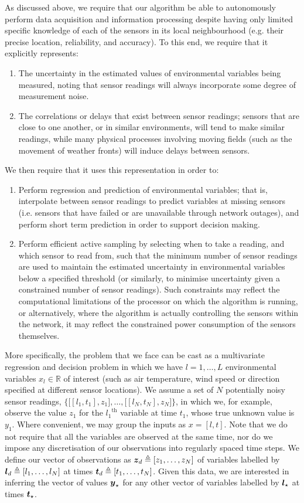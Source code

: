 \documentclass{acmtrans2m}
\begin{document}
\noindent As discussed above, we require that our algorithm be able to autonomously perform data acquisition and information processing despite having only limited specific knowledge of each of the sensors in its local neighbourhood (e.g. their precise location, reliability, and accuracy). To this end, we require that it explicitly represents:
\begin{enumerate}
\item The uncertainty in the estimated values of environmental variables being measured, noting that sensor readings will always incorporate some degree of measurement noise.
\item The correlations or delays that exist between sensor readings; sensors that are close to one another, or in similar environments, will tend to make similar readings, while many physical processes involving moving fields (such as the movement of weather fronts) will induce delays between sensors.
\end{enumerate}
We then require that it uses this representation in order to:
\begin{enumerate}
\item Perform regression and prediction of environmental variables; that is, interpolate between sensor readings to predict variables at missing sensors (i.e. sensors that have failed or are unavailable through network outages), and perform short term prediction in order to support decision making.
\item Perform efficient active sampling by selecting when to take a reading, and which sensor to read from, such that the minimum number of sensor readings are used to maintain the estimated uncertainty in environmental variables below a specified threshold (or similarly, to minimise uncertainty given a constrained number of sensor readings). Such constraints may reflect the computational limitations of the processor on which the algorithm is running, or alternatively, where the algorithm is actually controlling the sensors within the network, it may reflect the constrained power consumption of the sensors themselves.
\end{enumerate}
More specifically, the problem that we face can be cast as a multivariate regression and decision problem in which we have $l=1,\ldots, L$ environmental variables $x_l \in \mathbb{R}$ of interest (such as air temperature, wind speed or direction specified at different sensor locations). We assume a set of $N$ potentially noisy sensor readings, $ \bigl\{\bigl[[l_1,t_1],z_1\bigr],\ldots,\bigl[[l_N,t_N],z_N\bigr]\bigr\}$, in which we, for example, observe the value $z_1$ for the ${l_1}^\text{th}$ variable at time $t_1$, whose true unknown value is $y_1$. Where convenient, we may group the inputs as $x=[l,t]$. Note that we do not require that all the variables are observed at the same time, nor do we impose any discretisation of our observations into regularly spaced time steps. We define our vector of observations as $\boldsymbol{z}_d\triangleq[z_1,\ldots,z_N]$ of variables labelled by $\boldsymbol{l}_d\triangleq[l_1,\ldots,l_N]$ at times $\boldsymbol{t}_d\triangleq[t_1,\ldots,t_N]$. Given this data, we are interested in inferring the vector of values $\boldsymbol{y}_\star$ for any other vector of variables labelled by $\boldsymbol{l}_\star$ at times $\boldsymbol{t}_\star$.
\end{document}
